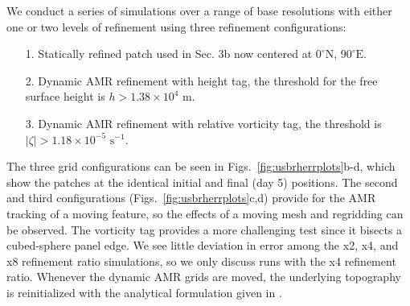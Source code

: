 We conduct a series of simulations over a range of base resolutions with
either one or two levels of refinement using three refinement
configurations:
\begin{itemize}
    \item[1.]
        Statically refined patch used in Sec.  3b
        now centered at $0^\circ\textrm{N}$, $90^\circ\textrm{E}$.
    \item[2.]
        Dynamic AMR refinement with height tag, the threshold for the free surface height is $h > 1.38 \times 10^{4}$ m.
    \item[3.]
        Dynamic AMR refinement with relative vorticity tag, 
        the threshold is $| \zeta | > 1.18 \times 10^{-5} \textrm{ s}^{-1}$.
\end{itemize}
The three grid configurations can be seen in 
Figs.~\ref{fig:usbrherrplots}b-d, which show the patches at the identical
initial and final (day 5) positions. The second and third configurations (Figs.~\ref{fig:usbrherrplots}c,d)
provide for the AMR tracking of a moving feature, so the effects of
a moving mesh and regridding can be observed.  The vorticity tag
provides a more challenging test since it bisects a cubed-sphere panel
edge.  We see little deviation in error among the x2, x4, and x8
refinement ratio simulations, so we only discuss runs with the x4
refinement ratio. Whenever the dynamic AMR grids are moved, the underlying
topography is reinitialized with the analytical formulation given in \cite{Lauter:2005uq}.
%
